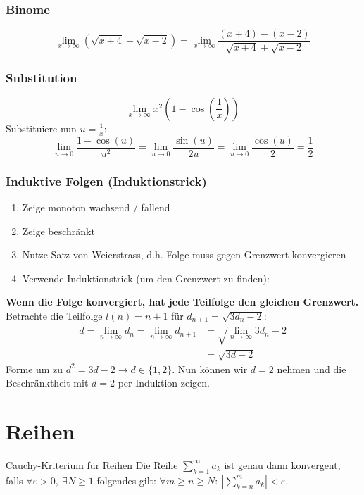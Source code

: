 \documentclass[a4paper,fontsize = 7pt]{scrartcl}
\def\sumk{\sum_{k=1}^\infty}
\begin{document}
\subsubsection{Binome}
$$\lim_{x\to\infty} (\sqrt{x + 4} - \sqrt{x - 2}) = \lim_{x\to\infty} \frac{(x+4)-(x-2)}{\sqrt{x+4}+\sqrt{x-2}}$$

\subsubsection{Substitution}
$$\lim_{x\to\infty} x^2 \left(1-\cos\left(\frac{1}{x}\right)\right)$$
Substituiere nun $u = \frac{1}{x}$:
$$\lim_{u \to 0} \frac{1 - \cos(u)}{u^2} = \lim_{u \to 0} \frac{\sin(u)}{2u} = \lim_{u\to 0} \frac{\cos(u)}{2} = \frac{1}{2}$$

\subsubsection{Induktive Folgen (Induktionstrick)}
\begin{enumerate}
  \item Zeige monoton wachsend / fallend
  \item Zeige beschränkt
  \item Nutze Satz von Weierstrass, d.h. Folge muss gegen Grenzwert konvergieren
  \item Verwende Induktionstrick (um den Grenzwert zu finden):
\end{enumerate}
\textbf{Wenn die Folge konvergiert, hat jede Teilfolge den gleichen Grenzwert.} Betrachte die Teilfolge $l(n) = n + 1$ für $d_{n+1} = \sqrt{3d_n - 2}$:
\begin{align*}
  d = \lim_{n\to\infty} d_n = \lim_{n\to\infty} d_{n+1} &= \sqrt{\lim_{n \to \infty} 3d_n -2}\\
   &= \sqrt{3d -2}
\end{align*}
Forme um zu $ d^2 = 3d -2 \to d \in \{1,2\}$. Nun können wir $d = 2$ nehmen und die Beschränktheit mit $d=2$ per Induktion zeigen.

\section{Reihen}

\begin{mainbox}{Cauchy-Kriterium für Reihen}
  \vspace{-4pt}
Die Reihe $\sumk a_k$ ist genau dann konvergent, falls $\forall \varepsilon > 0, \ \exists N \ge 1$ folgendes gilt: $\forall m \ge n \ge N: \ | \sum_{k=n}^m a_k | < \varepsilon$.
  \vspace{-4pt}
\end{mainbox}
\end{document}
